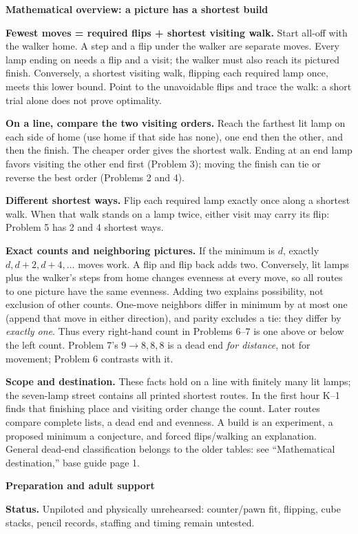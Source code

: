 \documentclass[11pt]{article}
\newcommand{\head}[1]{\par\textbf{\large #1}\par}
\begin{document}
\head{Mathematical overview: a picture has a shortest build}
\textbf{Fewest moves = required flips + shortest visiting walk.} Start all-off with the walker home. A step and a flip under the walker are separate moves. Every lamp ending on needs a flip and a visit; the walker must also reach its pictured finish. Conversely, a shortest visiting walk, flipping each required lamp once, meets this lower bound. Point to the unavoidable flips and trace the walk: a short trial alone does not prove optimality.

\textbf{On a line, compare the two visiting orders.} Reach the farthest lit lamp on each side of home (use home if that side has none), one end then the other, and then the finish. The cheaper order gives the shortest walk. Ending at an end lamp favors visiting the other end first (Problem 3); moving the finish can tie or reverse the best order (Problems 2 and 4).

\textbf{Different shortest ways.} Flip each required lamp exactly once along a shortest walk. When that walk stands on a lamp twice, either visit may carry its flip: Problem 5 has 2 and 4 shortest ways.

\textbf{Exact counts and neighboring pictures.} If the minimum is $d$, exactly $d,d+2,d+4,\ldots$ moves work. A flip and flip back adds two. Conversely, lit lamps plus the walker's steps from home changes evenness at every move, so all routes to one picture have the same evenness. Adding two explains possibility, not exclusion of other counts. One-move neighbors differ in minimum by at most one (append that move in either direction), and parity excludes a tie: they differ by \emph{exactly one}. Thus every right-hand count in Problems 6--7 is one above or below the left count. Problem 7's $9\to8,8,8$ is a dead end \emph{for distance}, not for movement; Problem 6 contrasts with it.

\textbf{Scope and destination.} These facts hold on a line with finitely many lit lamps; the seven-lamp street contains all printed shortest routes. In the first hour K--1 finds that finishing place and visiting order change the count. Later routes compare complete lists, a dead end and evenness. A build is an experiment, a proposed minimum a conjecture, and forced flips/walking an explanation. General dead-end classification belongs to the older tables: see ``Mathematical destination,'' base guide page 1.

\head{Preparation and adult support}
\textbf{Status.} Unpiloted and physically unrehearsed: counter/pawn fit, flipping, cube stacks, pencil records, staffing and timing remain untested.
\end{document}
